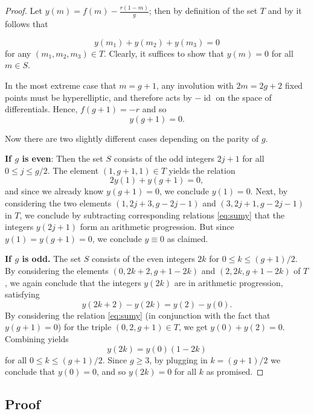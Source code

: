 \documentclass[reqno]{amsart}
\theoremstyle{plain}
\DeclareMathOperator{\id}{id}
\begin{document}
\begin{proof}
  Let $y(m) = f(m) - \frac{r(1-m)}{g}$; then by definition of the set $T$ and by
   it follows that 

  \begin{equation}
    \label{eq:sumy}
    y(m_1) + y(m_2) + y(m_3)
  = 0
\end{equation} for any $(m_1, m_2, m_3) \in T$.  Clearly, it suffices to show that $y(m) = 0$ for all $m \in S$. 

  In the most extreme case that $m = g+1$, any involution with $2m = 2g+2$ fixed points must be
  hyperelliptic, and therefore acts by $-\id$ on the space of differentials.
  Hence, $f(g+1) = -r$ and so \[y(g+1) = 0.\]

  Now there are two slightly different cases depending on the parity of $g$.  

  \textbf{If $g$ is even}: Then the set $S$ consists of the odd integers
  $2j+1$ for all $0 \leq j \leq g/2$.  The element $(1, g+1, 1) \in
  T$ yields the relation \[2y(1) + y(g+1) = 0,\] and since we already know $y(g+1)=0$, we conclude $y(1) = 0$. 
  Next, by considering the two elements $(1,2j+3,g-2j-1)$ and $(3,2j+1,g-2j-1)$
  in $T$, we conclude by subtracting corresponding relations \eqref{eq:sumy}
  that the integers $y(2j+1)$ form an arithmetic progression.  But since $y(1) =
  y(g+1) = 0$, we conclude $y \equiv 0$ as claimed. 

  \textbf{If $g$ is odd.} The set $S$ consists of the even integers $2k$ for $0
  \leq k \leq (g+1)/2$.  By considering the elements $(0,2k+2,g+1-2k)$ and
  $(2,2k,g+1-2k)$ of $T$, we again conclude that the integers $y(2k)$ are in
  arithmetic progression, satisfying \[y(2k+2) - y(2k) = y(2) - y(0).\]  By
  considering the relation \eqref{eq:sumy} (in conjunction with
  the fact that $y(g+1) = 0$)  for the triple
  $(0,2,g+1) \in T$, we get $y(0) + y(2) = 0$. Combining yields \[y(2k) =
  y(0)(1-2k)\] for all $0 \leq k \leq (g+1)/2$. Since $g \geq 3$, by
  plugging in $k = (g+1)/2$ we conclude that $y(0)=0$, and so $y(2k)=0$ for all $k$ as
  promised.  
\end{proof}

\subsection{Proof}
\end{document}
